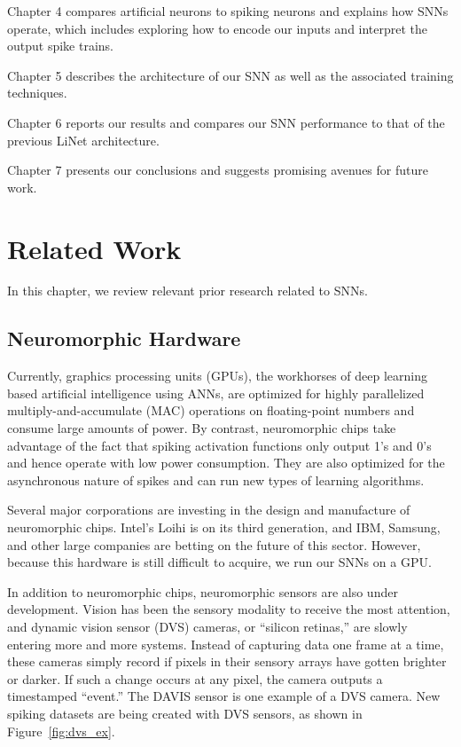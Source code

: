 \documentclass [MS] {UCLAthesis}
\begin{document}
Chapter 4 compares artificial neurons to spiking neurons and explains how SNNs operate, which includes exploring how to encode our inputs and interpret the output spike trains.

Chapter 5 describes the architecture of our SNN as well as the associated training techniques.

Chapter 6 reports our results and compares our SNN performance to that of the previous LiNet architecture.

Chapter 7 presents our conclusions and suggests promising avenues for future work.


\chapter{Related Work}

In this chapter, we review relevant prior research related to SNNs.


\section{Neuromorphic Hardware}

Currently, graphics processing units (GPUs), the workhorses of deep learning based artificial intelligence using ANNs, are optimized for highly parallelized multiply-and-accumulate (MAC) operations on floating-point numbers and consume large amounts of power. By contrast, neuromorphic chips take advantage of the fact that spiking activation functions only output 1's and 0's and hence operate with low power consumption. They are also optimized for the asynchronous nature of spikes and can run new types of learning algorithms. 

Several major corporations are investing in the design and manufacture of neuromorphic chips. Intel's Loihi \citep{8259423} is on its third generation, and IBM, Samsung, and other large companies are betting on the future of this sector. However, because this hardware is still difficult to acquire, we run our SNNs on a GPU.

In addition to neuromorphic chips, neuromorphic sensors are also under development. Vision has been the sensory modality to receive the most attention, and dynamic vision sensor (DVS) cameras, or ``silicon retinas,'' are slowly entering more and more systems. Instead of capturing data one frame at a time, these cameras simply record if pixels in their sensory arrays have gotten brighter or darker. If such a change occurs at any pixel, the camera outputs a timestamped ``event.'' The DAVIS sensor \citep{davis_dvs} is one example of a DVS camera. New spiking datasets are being created with DVS sensors, as shown in Figure~\ref{fig:dvs_ex}. 
\end{document}
